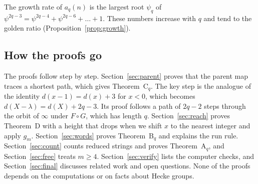 The growth rate of $a_q(n)$ is the largest root $\psi_q$ of
$\psi^{2q-3}=\psi^{2q-4}+\psi^{2q-6}+\dots+1$. These numbers increase with $q$ and tend to the
golden ratio (Proposition~\ref{prop:growth}).

\subsection{How the proofs go}

The proofs follow \cite{P137} step by step. Section~\ref{sec:parent} proves that the parent map
traces a shortest path, which gives Theorem~C$_q$. The key step is the analogue of the identity
$d(x-1)=d(x)+3$ for $x<0$, which becomes $d(X-\lambda)=d(X)+2q-3$. Its proof follows a path of $2q-2$
steps through the orbit of $\infty$ under $F\circ G$, which has length $q$. Section~\ref{sec:reach}
proves Theorem~D with a height that drops when we shift $x$ to the nearest integer and apply $g_m$. Section~\ref{sec:words} proves
Theorem~B$_q$ and explains the run rule. Section~\ref{sec:count} counts reduced strings and proves
Theorem~A$_q$, and Section~\ref{sec:free} treats $m\ge4$. Section~\ref{sec:verify} lists the
computer checks, and Section~\ref{sec:final} discusses related work and open questions. None of the
proofs depends on the computations or on facts about Hecke groups.
